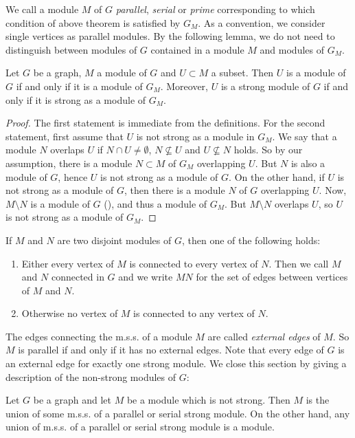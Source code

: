 \documentclass{amsart}
\makeatletter
\theoremstyle{plain}
{
	\newtheorem{{lemma}}{{Lemma}}[section]
	\labelformat{{lemma}}{{Lemma}##}
}
{
	\newtheorem{{theorem}}{{Theorem}}[section]
	\labelformat{{theorem}}{{Theorem}##}
}
{	\@namedef{c@{theorem}}{\@nameuse{c@{lemma}}}}
{
	\newtheorem{{corollary}}{{Corollary}}[section]
	\labelformat{{corollary}}{{Corollary}##}
}
{	\@namedef{c@{corollary}}{\@nameuse{c@{lemma}}}}
{
	\newtheorem{{proposition}}{{Proposition}}[section]
	\labelformat{{proposition}}{{Proposition}##}
}
{	\@namedef{c@{proposition}}{\@nameuse{c@{lemma}}}}
{
	\newtheorem{{algorithm}}{{Construction}}[section]
	\labelformat{{algorithm}}{{Construction}##}
}
{	\@namedef{c@{algorithm}}{\@nameuse{c@{lemma}}}}
\theoremstyle{definition}
{
	\newtheorem{{definition}}{{Definition}}[section]
	\labelformat{{definition}}{{Definition}##}
}
{	\@namedef{c@{definition}}{\@nameuse{c@{lemma}}}}
{
	\newtheorem{{problem}}{{Problem}}[section]
	\labelformat{{problem}}{{Problem}##}
}
{	\@namedef{c@{problem}}{\@nameuse{c@{lemma}}}}
\makeatother
\begin{document}
We call a module $M$ of $G$ \emph{parallel}, \emph{serial} or \emph{prime} corresponding to which condition of above theorem is satisfied by $G_M$.
As a convention, we consider single vertices as parallel modules.
By the following lemma, we do not need to distinguish between modules of $G$ contained in a module $M$ and modules of $G_M$.
\begin{lemma}\label{prop:untermod}
	Let $G$ be a graph, $M$ a module of $G$ and $U \subset M$ a subset. Then $U$ is a module of $G$ if and only if it is a module of $G_M$.
	Moreover, $U$ is a strong module of $G$ if and only if it is strong as a module of $G_M$.
\end{lemma}
\begin{proof}
	The first statement is immediate from the definitions.
	For the second statement, first assume that $U$ is not strong as a module in $G_M$.
	We say that a module $N$ overlaps $U$ if $N \cap U \neq \emptyset$, $N \nsubseteq U$ and $U \nsubseteq N$ holds. 
	So by our assumption, there is a module $N \subset M$ of $G_M$ overlapping $U$. But $N$ is also a module of $G$, hence $U$ is not strong as a module of $G$.
	On the other hand, if $U$ is not strong as a module of $G$, then there is a module $N$ of $G$ overlapping $U$. Now, $M \setminus N$ is a module of $G$ (\cite[Prop 1.5.1 (ii)]{brandt}), and thus a module of $G_M$. But $M\setminus N$ overlaps $U$, so $U$ is not strong as a module of $G_M$.
\end{proof}
\noindent If $M$ and $N$ are two disjoint modules of $G$, then one of the following holds:
\begin{enumerate}
	\item Either every vertex of $M$ is connected to every vertex of $N$. Then we call $M$ and $N$ connected in $G$ and we write $MN$ for the set of edges between vertices of $M$ and $N$.
	\item Otherwise no vertex of $M$ is connected to any vertex of $N$.
\end{enumerate}
The edges connecting the m.s.s. of a module $M$ are called \emph{external edges} of $M$.
So $M$ is parallel if and only if it has no external edges.
Note that every edge of $G$ is an external edge for exactly one strong module.
We close this section by giving a description of the non-strong modules of $G$:
\begin{lemma}\label{lemma:L2}
	Let $G$ be a graph and let $M$ be a module which is not strong. Then $M$ is the union of some m.s.s. of a parallel or serial strong module.
	On the other hand, any union of m.s.s. of a parallel or serial strong module is a module.
\end{lemma}
\end{document}

